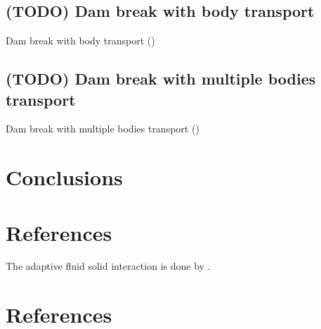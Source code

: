 \documentclass[preprint,12pt]{elsarticle}
\begin{document}
\subsection{(TODO) Dam break with body transport}
Dam break with body transport (\citet{wang2019numerical})
%
\subsection{(TODO) Dam break with multiple bodies transport}
Dam break with multiple bodies transport (\citet{wang2019numerical})
%




\section{Conclusions}
\label{sec:conclusions}


\section*{References}
\label{sec:references}

The adaptive fluid solid interaction is done by \citet{hu2019consistent}.


\section*{References}


\end{document}
